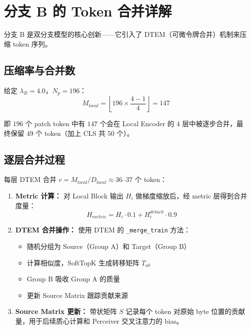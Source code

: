 \documentclass[a4paper,11pt]{article}
\begin{document}
\section{分支 B 的 Token 合并详解}

分支 B 是双分支模型的核心创新——它引入了 DTEM（可微令牌合并）机制来压缩 token 序列。

\subsection{压缩率与合并数}

给定 $\lambda_B = 4.0$，$N_p = 196$：
\[
    M_{local} = \left\lfloor 196 \times \frac{4-1}{4} \right\rfloor = 147
\]

即 $196$ 个 patch token 中有 $147$ 个会在 Local Encoder 的 $4$ 层中被逐步合并，最终保留 $49$ 个 token（加上 CLS 共 $50$ 个）。

\subsection{逐层合并过程}

每层 DTEM 合并 $r = M_{local} / D_{local} \approx 36\text{--}37$ 个 token：

\begin{enumerate}
    \item \textbf{Metric 计算：} 对 Local Block 输出 $H_i$ 做梯度缩放后，经 metric 层得到合并度量：
    \[
        H_{metric} = H_i \cdot 0.1 + H_i^{detach} \cdot 0.9
    \]
    
    \item \textbf{DTEM 合并操作：} 使用 DTEM 的 \texttt{\_merge\_train} 方法：
    \begin{itemize}
        \item 随机分组为 Source（Group A）和 Target（Group B）
        \item 计算相似度，SoftTopK 生成转移矩阵 $T_{ab}$
        \item Group B 吸收 Group A 的质量
        \item 更新 Source Matrix 跟踪贡献来源
    \end{itemize}
    
    \item \textbf{Source Matrix 更新：} 带状矩阵 $S$ 记录每个 token 对原始 byte 位置的贡献量，用于后续质心计算和 Perceiver 交叉注意力的 bias。
\end{enumerate}
\end{document}
